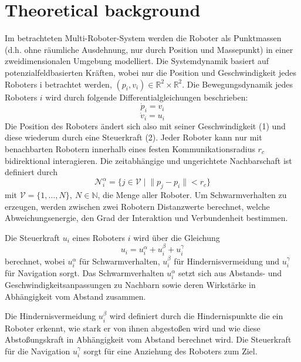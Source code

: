 \documentclass[conference]{IEEEtran}
\begin{document}
\section{Theoretical background}
Im betrachteten Multi-Roboter-System werden die Roboter als Punktmassen 
(d.h. ohne räumliche Ausdehnung, nur durch Position und Massepunkt) in einer 
zweidimensionalen Umgebung modelliert. Die Systemdynamik basiert auf potenzialfeldbasierten 
Kräften, wobei nur die Position und Geschwindigkeit jedes Roboters i betrachtet werden,
$(p_i, v_i) \in \mathbb{R}^2 \times \mathbb{R}^2$.
Die Bewegungsdynamik jedes Roboters $i$ wird durch folgende Differentialgleichungen beschrieben:
\begin{equation}
    \dot{p}_i = v_i
\end{equation}
\begin{equation}
    \dot{v}_i = u_i
\end{equation}
Die Position des Roboters ändert sich also mit seiner Geschwindigkeit (1) und diese wiederum durch eine Steuerkraft (2).
Jeder Roboter kann nur mit benachbarten Robotern innerhalb eines festen 
Kommunikationsradius $r_c$ bidirektional interagieren. Die zeitabhängige und ungerichtete Nachbarschaft ist definiert durch
\begin{equation}
\mathcal{N}_i^\alpha = \{ j \in \mathcal{V} \; | \; \| p_j - p_i \| < r_c \}
\end{equation}
mit $\mathcal{V} = \{1, \ldots, N\},\ N \in \mathbb{N}$, die Menge aller Roboter.
Um Schwarmverhalten zu erzeugen, werden zwischen zwei Robotern Distanzwerte berechnet, 
welche Abweichungsenergie, den Grad der Interaktion und Verbundenheit bestimmen.

Die Steuerkraft $u_i$ eines Roboters $i$ wird über die Gleichung
\begin{equation}
u_i = u_i^\alpha + u_i^\beta + u_i^\gamma
\end{equation}
berechnet, wobei $u_i^\alpha$ für Schwarmverhalten, $u_i^\beta$ für 
Hindernisvermeidung und $u_i^\gamma$ für Navigation sorgt. Das Schwarmverhalten 
$u_i^\alpha$ setzt sich aus Abstands- und Geschwindigkeitsanpassungen zu Nachbarn 
sowie deren Wirkstärke in Abhängigkeit vom Abstand zusammen.

Die Hindernisvermeidung $u_i^\beta$ wird definiert durch die Hindernispunkte 
die ein Roboter erkennt, wie stark er von ihnen 
abgestoßen wird und wie diese Abstoßungskraft in Abhängigkeit vom Abstand 
berechnet wird. Die Steuerkraft für die Navigation $u_i^\gamma$ sorgt für eine Anziehung
des Roboters zum Ziel.
\end{document}
